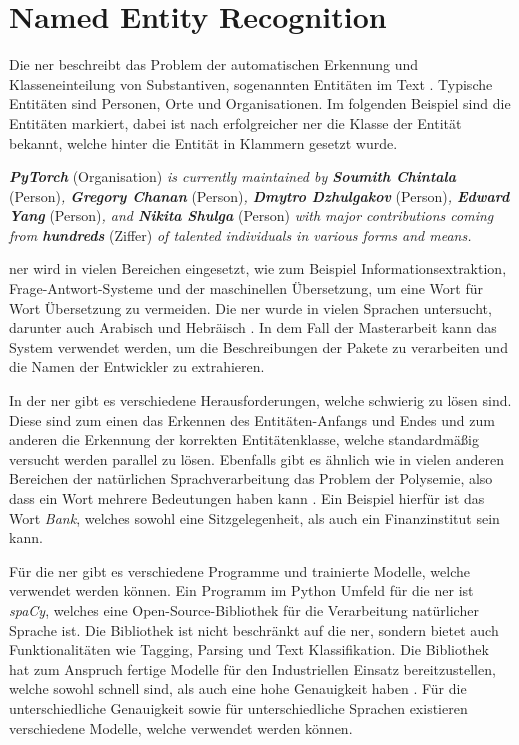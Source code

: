 \section{Named Entity Recognition}
\label{sec:named-entity-recognition}
Die \gls{ner} beschreibt das Problem der automatischen Erkennung und Klasseneinteilung von Substantiven, sogenannten Entitäten im Text \autocite{mohit_named_2014}.
Typische Entitäten sind Personen, Orte und Organisationen.
Im folgenden Beispiel sind die Entitäten markiert, dabei ist nach erfolgreicher \gls{ner} die Klasse der Entität bekannt, welche hinter die Entität in Klammern gesetzt wurde.

\begin{addmargin}[25pt]{0pt}
    \textit{\textbf{PyTorch}} (Organisation) \textit{is currently maintained by \textbf{Soumith Chintala}} (Person)\textit{, \textbf{Gregory Chanan}} (Person)\textit{, \textbf{Dmytro Dzhulgakov}} (Person)\textit{, \textbf{Edward Yang}} (Person)\textit{, and \textbf{Nikita Shulga}} (Person) \textit{with major contributions coming from \textbf{hundreds}} (Ziffer) \textit{of talented individuals in various forms and means.}
\end{addmargin}

\gls{ner} wird in vielen Bereichen eingesetzt, wie zum Beispiel Informationsextraktion, Frage-Antwort-Systeme und der maschinellen Übersetzung, um eine Wort für Wort Übersetzung zu vermeiden.
Die \gls{ner} wurde in vielen Sprachen untersucht, darunter auch Arabisch und Hebräisch \autocite{mohit_named_2014}.
In dem Fall der Masterarbeit kann das System verwendet werden, um die Beschreibungen der Pakete zu verarbeiten und die Namen der Entwickler zu extrahieren.

In der \gls{ner} gibt es verschiedene Herausforderungen, welche schwierig zu lösen sind.
Diese sind zum einen das Erkennen des Entitäten-Anfangs und Endes und zum anderen die Erkennung der korrekten Entitätenklasse, welche standardmäßig versucht werden parallel zu lösen.
Ebenfalls gibt es ähnlich wie in vielen anderen Bereichen der natürlichen Sprachverarbeitung das Problem der Polysemie, also dass ein Wort mehrere Bedeutungen haben kann \autocite{mohit_named_2014}.
Ein Beispiel hierfür ist das Wort \textit{Bank}, welches sowohl eine Sitzgelegenheit, als auch ein Finanzinstitut sein kann.

Für die \gls{ner} gibt es verschiedene Programme und trainierte Modelle, welche verwendet werden können.
Ein Programm im Python Umfeld für die \gls{ner} ist \textit{spaCy}, welches eine Open-Source-Bibliothek für die Verarbeitung natürlicher Sprache ist.
Die Bibliothek ist nicht beschränkt auf die \gls{ner}, sondern bietet auch Funktionalitäten wie Tagging, Parsing und Text Klassifikation.
Die Bibliothek hat zum Anspruch fertige Modelle für den Industriellen Einsatz bereitzustellen, welche sowohl schnell sind, als auch eine hohe Genauigkeit haben \autocite{honnibal_spacy_2020}.
Für die unterschiedliche Genauigkeit sowie für unterschiedliche Sprachen existieren verschiedene Modelle, welche verwendet werden können.
